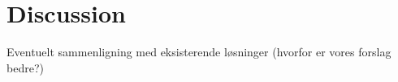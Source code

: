 \chapter{Discussion}

Eventuelt sammenligning med eksisterende løsninger (hvorfor er vores forslag bedre?)

